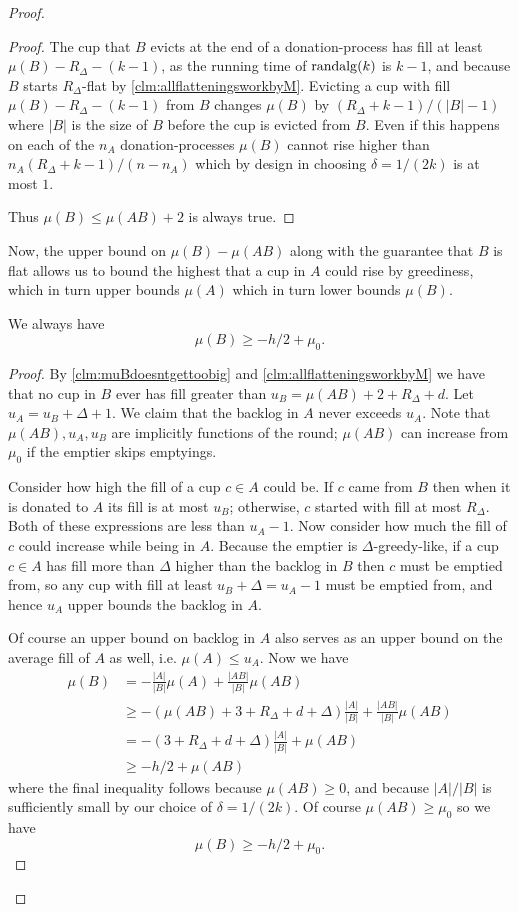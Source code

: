 \begin{proof}
\begin{proof}
  The cup that $B$ evicts at the end of a
  donation-process has fill at least $\mu(B) - R_\Delta -
  (k-1)$, as the running time of $\operatorname{\text{\textup{randalg}}}(k)$ is $k-1$, and
  because $B$ starts $R_\Delta$-flat by
  \cref{clm:allflatteningsworkbyM}. Evicting a cup
  with fill $\mu(B) - R_\Delta - (k -1)$ from $B$ changes
  $\mu(B)$ by $(R_\Delta + k - 1) / (|B|-1)$ where $|B|$ is the
  size of $B$ before the cup is evicted from $B$. Even if this
  happens on each of the $n_A$ donation-processes $\mu(B)$ cannot
  rise higher than $n_A (R_\Delta + k-1) / (n-n_A)$ which by
  design in choosing $\delta = 1/(2k)$ is at most $1$.

  Thus $\mu(B) \le \mu(AB) + 2$ is always true.

\end{proof}

Now, the upper bound on $\mu(B)-\mu(AB)$ along with the guarantee
that $B$ is flat allows us to bound the highest that a cup in $A$
could rise by greediness, which in turn upper bounds $\mu(A)$
which in turn lower bounds $\mu(B)$. 
\begin{clm}
  \label{clm:muBgreaterthanminushover2}
  We always have
  $$\mu(B) \ge -h/2 + \mu_0.$$
\end{clm}
\begin{proof}
  By \cref{clm:muBdoesntgettoobig} and \cref{clm:allflatteningsworkbyM} 
  we have that no cup in $B$ ever has fill greater than
  $u_B = \mu(A B) + 2 + R_\Delta + d$. 
  Let $u_A = u_B + \Delta + 1$. We claim that the backlog in $A$
  never exceeds $u_A$. Note that $\mu(AB), u_A, u_B$ are
  implicitly functions of the round; $\mu(AB)$ can increase from
  $\mu_0$ if the emptier skips emptyings.

  Consider how high the fill of a cup $c \in A$ could be.
  If $c$ came from $B$ then when it is donated
  to $A$ its fill is at most $u_B$; otherwise, $c$
  started with fill at most $R_\Delta$. Both of these expressions
  are less than $u_A - 1$. Now consider how
  much the fill of $c$ could increase while being in $A$. Because
  the emptier is $\Delta$-greedy-like, if a cup $c\in A$ has fill
  more than $\Delta$ higher than the backlog in $B$ then $c$ must
  be emptied from, so any cup with fill at least $u_B + \Delta =
  u_A - 1$ must be emptied from, and hence $u_A$ upper bounds the
  backlog in $A$. 

  Of course an upper bound on backlog in $A$ also serves as
  an upper bound on the average fill of $A$ as well, i.e.
  $\mu(A) \le u_A$.  Now we have
  \begin{align*}
    \mu(B) &= -\frac{|A|}{|B|} \mu(A) + \frac{|A B|}{|B|}\mu(A B) \\
           &\ge -(\mu(AB) + 3+R_\Delta+d+\Delta) \frac{|A|}{|B|} + \frac{|AB|}{|B|}\mu(AB)\\
           &= -(3+R_\Delta+d + \Delta) \frac{|A|}{|B|} + \mu(AB)\\
           &\ge -h/2 + \mu(AB)
  \end{align*}
  where the final inequality follows because $\mu(AB) \ge 0$, and
  because $|A|/|B|$ is sufficiently small by our choice of $\delta = 1/(2k)$.
  Of course $\mu(AB) \ge \mu_0$ so we have
  $$\mu(B) \ge -h/2 + \mu_0.$$


\end{proof}
\end{proof}
